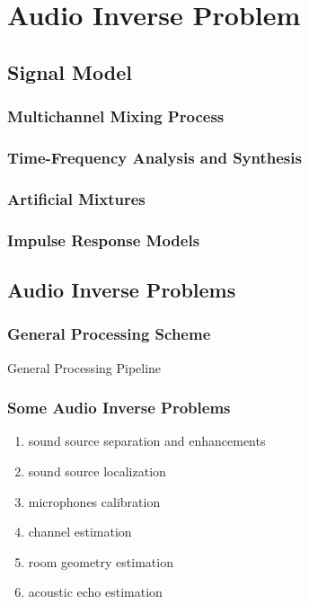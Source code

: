 \chapter{Audio Inverse Problem}\label{chap:processing}


\section{Signal Model}
\subsection{Multichannel Mixing Process}

\subsection{Time-Frequency Analysis and Synthesis}

\subsection{Artificial Mixtures}

\subsection{Impulse Response Models}





\section{Audio Inverse Problems}

\subsection{General Processing Scheme}
General Processing Pipeline

\subsection{Some Audio Inverse Problems}
\begin{enumerate}
    \item sound source separation and enhancements
    \item sound source localization
    \item microphones calibration
    \item channel estimation
    \item room geometry estimation
    \item acoustic echo estimation
\end{enumerate}


